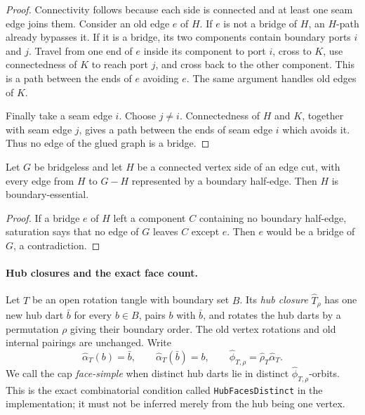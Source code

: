 \begin{proof}
Connectivity follows because each side is connected and at least one seam
edge joins them.  Consider an old edge \(e\) of \(H\).  If \(e\) is not a
bridge of \(H\), an \(H\)-path already bypasses it.  If it is a bridge, its
two components contain boundary ports \(i\) and \(j\).  Travel from one end
of \(e\) inside its component to port \(i\), cross to \(K\), use
connectedness of \(K\) to reach port \(j\), and cross back to the other
component.  This is a path between the ends of \(e\) avoiding \(e\).
The same argument handles old edges of \(K\).

Finally take a seam edge \(i\).  Choose \(j\ne i\).  Connectedness of \(H\)
and \(K\), together with seam edge \(j\), gives a path between the ends of
seam edge \(i\) which avoids it.  Thus no edge of the glued graph is a
bridge.
\end{proof}

\begin{lemma}
\label{lem:saturated-side-boundary-essential}
Let \(G\) be bridgeless and let \(H\) be a connected vertex side of an edge
cut, with every edge from \(H\) to \(G-H\) represented by a boundary
half-edge.  Then \(H\) is boundary-essential.
\end{lemma}

\begin{proof}
If a bridge \(e\) of \(H\) left a component \(C\) containing no boundary
half-edge, saturation says that no edge of \(G\) leaves \(C\) except \(e\).
Then \(e\) would be a bridge of \(G\), a contradiction.
\end{proof}

\paragraph{Hub closures and the exact face count.}
Let \(T\) be an open rotation tangle with boundary set \(B\).  Its
\emph{hub closure} \(\widehat T_\rho\) has one new hub dart
\(\bar b\) for every \(b\in B\), pairs \(b\) with \(\bar b\), and
rotates the hub darts by a permutation \(\rho\) giving their boundary
order.  The old vertex rotations and old internal pairings are unchanged.
Write
\[
 \widehat\alpha_T(b)=\bar b,
 \qquad
 \widehat\alpha_T(\bar b)=b,
 \qquad
 \widehat\phi_{T,\rho}=\widehat\rho_T\widehat\alpha_T.
\]
We call the cap \emph{face-simple} when distinct hub darts lie in distinct
\(\widehat\phi_{T,\rho}\)-orbits.  This is the exact combinatorial
condition called \texttt{HubFacesDistinct} in the implementation; it must
not be inferred merely from the hub being one vertex.

